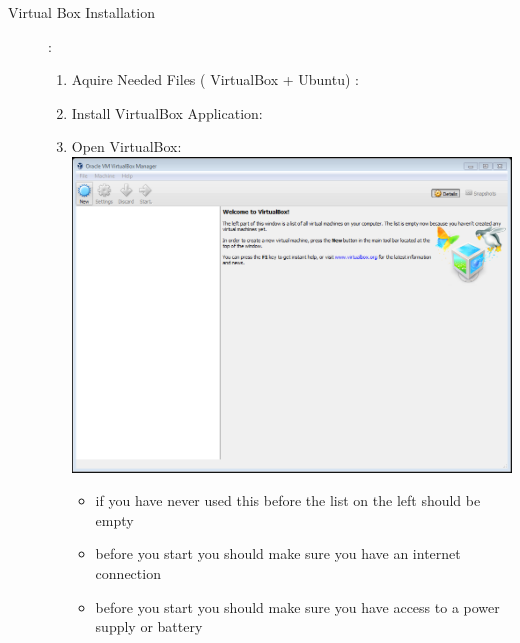 \documentclass[12pt]{article}
\begin{document}
\begin{description}
\begin{enumerate}
                \end{enumerate}



\newpage

\item[Virtual Box Installation]: \vspace{0mm} \\

	\begin{enumerate}
	
	
	
	
\item  Aquire Needed Files ( VirtualBox + Ubuntu) : \vspace{5mm} \\
\item Install VirtualBox Application: \vspace{5mm} \\
    	\item Open VirtualBox: \vspace{20mm} \\
      		\includegraphics[scale=.6]{Capture1.png}\\
            \begin{itemize}
                
                \item if you have never used this before the list on the left should be empty
                
                \item before you start you should make sure you have an internet connection
                \item before you start you should make sure you have access to a power supply or battery
                

\end{itemize}
\end{enumerate}
\end{description}
\end{document}

